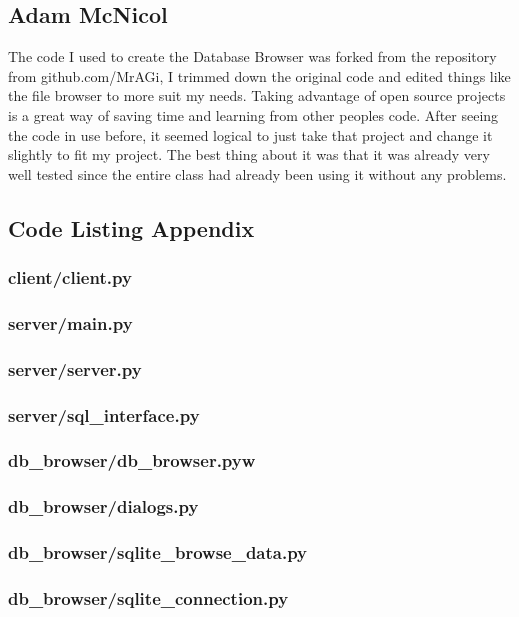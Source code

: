 \documentclass[a4paper]{article}
\begin{document}
\subsection{Adam McNicol}
The code I used to create the Database Browser was forked from the repository from github.com/MrAGi, I trimmed
down the original code and edited things like the file browser to more suit my needs. Taking advantage of
open source projects is a great way of saving time and learning from other peoples code. After seeing the code
in use before, it seemed logical to just take that project and change it slightly to fit my project. The best
thing about it was that it was already very well tested since the entire class had already been using it without
any problems.

\subsection{Code Listing Appendix}
\newpage
\subsubsection{client/client.py}
\label{sec:client.py}


\subsubsection{server/main.py}
\label{sec:main.py}


\subsubsection{server/server.py}
\label{sec:server.py}


\subsubsection{server/sql\_interface.py}
\label{sec:sqlinterface.py}


\subsubsection{db\_browser/db\_browser.pyw}
\label{sec:dbbrowser.py}


\subsubsection{db\_browser/dialogs.py}
\label{sec:dialogs.py}


\subsubsection{db\_browser/sqlite\_browse\_data.py}
\label{sec:browsedata.py}


\subsubsection{db\_browser/sqlite\_connection.py}
\label{sec:connection.py}

\end{document}
